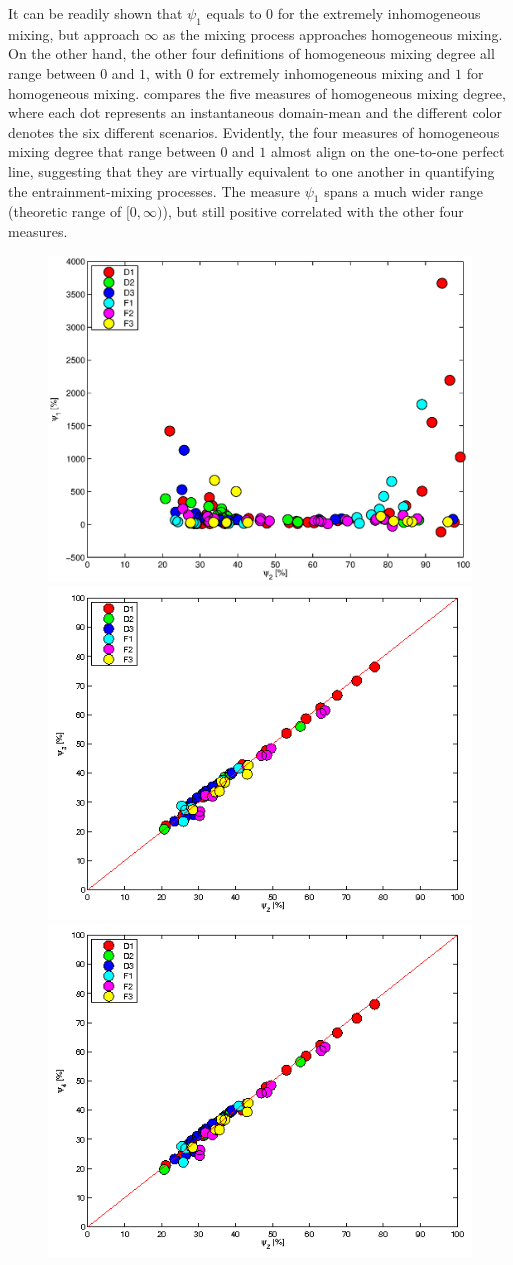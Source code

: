 \documentclass[draft,jgrga]{AGUTeX}
\begin{document}
\begin{article}
It can be readily shown that $\psi_1$ equals to $0$ for the extremely inhomogeneous mixing, but 
approach $\infty$ as the mixing process approaches homogeneous mixing. On the other hand, the 
other four definitions of homogeneous mixing degree all range between $0$ and $1$, with $0$ for 
extremely inhomogeneous mixing and $1$ for homogeneous mixing. 
 compares the five measures of homogeneous mixing degree, where each dot represents an 
instantaneous domain-mean and the different color denotes the six different scenarios.
Evidently, the four measures of homogeneous mixing degree that range between $0$ and $1$ almost align on the one-to-one perfect line, suggesting that they are virtually equivalent to one another in quantifying the entrainment-mixing processes. The measure $\psi_1$ spans a much wider range (theoretic range of $[0, \infty)$), but still positive correlated with the other four measures.
\begin{figure}[!htbp]\centering
\includegraphics[width=0.45\linewidth]{Figures/phi2_phi1}
\includegraphics[width=0.45\linewidth]{Figures/phi2_phi3}\\
\includegraphics[width=0.45\linewidth]{Figures/phi2_phi4}

\end{figure}
\end{article}
\end{document}
